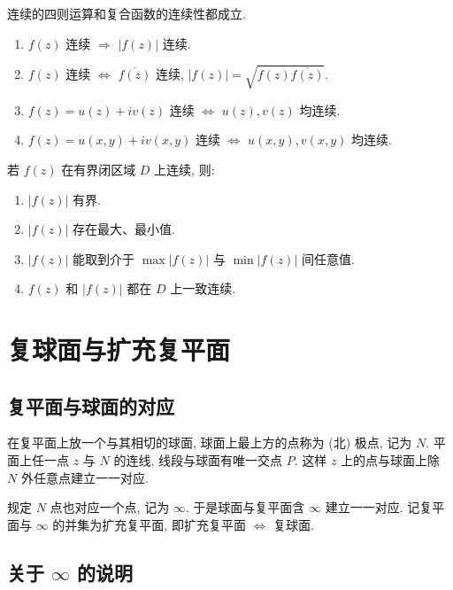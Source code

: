 \documentclass[theorem=false,mathfont=none,openany,sub3section]{easybook}
\begin{document}
连续的四则运算和复合函数的连续性都成立.\par
\begin{enumerate}
  \item $f(z)$ 连续 $\Rightarrow$ $|f(z)|$ 连续.
  \item $f(z)$ 连续 $\Leftrightarrow$ $\overline{f(z)}$ 连续, $|f(z)|=\sqrt{f(z)\overline{f(z)}}$.
  \item $f(z)=u(z)+iv(z)$ 连续 $\Leftrightarrow$ $u(z),v(z)$ 均连续.
  \item $f(z)=u(x,y)+iv(x,y)$ 连续 $\Leftrightarrow$ $u(x,y),v(x,y)$ 均连续.
\end{enumerate}

\begin{theorem}
  若 $f(z)$ 在有界闭区域 $D$ 上连续, 则:
  \begin{enumerate}
    \item $|f(z)|$ 有界.
    \item $|f(z)|$ 存在最大、最小值.
    \item $|f(z)|$ 能取到介于 $\max|f(z)|$ 与 $\min|f(z)|$ 间任意值.
    \item $f(z)$ 和 $|f(z)|$ 都在 $D$ 上一致连续.
  \end{enumerate}
\end{theorem}

\newpage

\section{复球面与扩充复平面}

\subsection{复平面与球面的对应}

在复平面上放一个与其相切的球面, 球面上最上方的点称为 (北) 极点, 记为 $N$. 平面上任一点 $z$ 与 $N$ 的连线, 线段与球面有唯一交点 $P$. 这样 $z$ 上的点与球面上除 $N$ 外任意点建立一一对应.\par
规定 $N$ 点也对应一个点, 记为 $\infty$. 于是球面与复平面含 $\infty$ 建立一一对应. 记复平面与 $\infty$ 的并集为扩充复平面, 即扩充复平面 $\Leftrightarrow$ 复球面.

\subsection{\texorpdfstring{关于 $\infty$ 的说明}{关于无穷远点的说明}}
\end{document}
